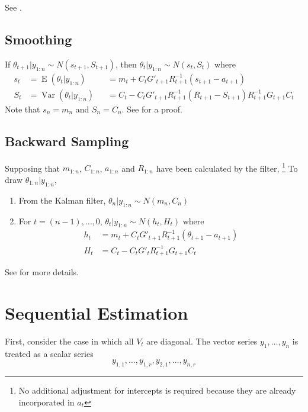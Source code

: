 \documentclass{article}\usepackage[]{graphicx}\usepackage[]{color}
\DeclareMathOperator{\E}{E}
\DeclareMathOperator{\Var}{Var}
\begin{document}
See \textcite[Chapter 5, p. 57]{KoopmanShephardDoornik2008}.


\subsection{Smoothing}
\label{sec:smoothing}

If $\theta_{t+1} | y_{1:n} \sim N(s_{t+1}, S_{t+1})$, then $\theta_{t} | y_{1:n} \sim N(s_{t}, S_{t})$ where
\begin{align}
  s_{t} &= \E(\theta_{t} | y_{1:n}) &&= m_{t} + C_{t} G'_{t+1} R_{t+1}^{-1}(s_{t+1} - a_{t+1}) \\
  S_{t} &= \Var(\theta_{t} | y_{1:n}) &&= C_{t} - C_{t} G'_{t+1} R^{-1}_{t+1} (R_{t+1} - S_{t+1}) R^{-1}_{t+1} G_{t+1} C_{t}
\end{align}
Note that $s_{n} = m_{n}$ and $S_{n} = C_{n}$.
See \textcite[Prop 2.4, p. 61]{PetrisPetroneEtAl2009} for a proof.


\subsection{Backward Sampling}
\label{sec:backward-sample}

Supposing that $m_{1:n}$, $C_{1:n}$, $a_{1:n}$ and $R_{1:n}$ have been calculated by the filter,%
\footnote{No additional adjustment for intercepts is required because they are already incorporated in $a_{t}$}
To draw $\theta_{1:n} | y_{1:n}$,

\begin{enumerate}
\item From the Kalman filter, $\theta_{n} | y_{1:n} \sim N(m_{n}, C_{n})$
\item For $t = (n-1), \dots, 0$, $\theta_{t} | y_{1:n} \sim N(h_{t}, H_{t})$ where
  \begin{align}
    h_{t} &= m_{t} + C_{t} G'_{t + 1} R_{t+1}^{-1}(\theta_{t+1} - a_{t+1}) \\
    H_{t} &= C_{t} - C_{t} G'_{t} R_{t+1}^{-1} G_{t+1} C_{t}
  \end{align}
\end{enumerate}
See \textcite[Chapter 4.4.1, p. 161]{PetrisPetroneEtAl2009} for more details.

\section{Sequential Estimation}

First, consider the case in which all $V_{t}$ are diagonal.
The vector series $y_{1}, \dots, y_{n}$ is treated as a scalar series
\begin{equation}
  y_{1,1}, \dots, y_{1,r}, y_{2,1}, \dots, y_{n,r}
\end{equation}
\end{document}
